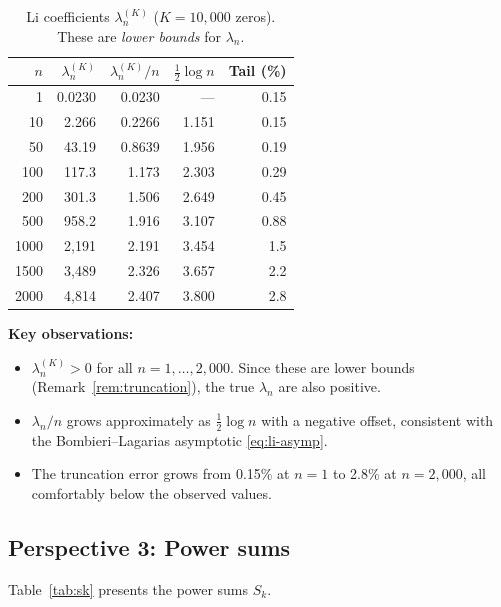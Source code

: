 \documentclass[11pt,a4paper]{article}
\theoremstyle{definition}
\begin{document}
\begin{table}[H]
\centering
\caption{Li coefficients $\lambda_n^{(K)}$ ($K = 10{,}000$ zeros). These are \emph{lower bounds} for $\lambda_n$.}
\label{tab:li}
\begin{tabular}{@{}rrrrr@{}}
\toprule
$n$ & $\lambda_n^{(K)}$ & $\lambda_n^{(K)}/n$ & $\tfrac{1}{2}\log n$ & Tail (\%) \\
\midrule
1     & 0.0230     & 0.0230    & ---     & 0.15 \\
10    & 2.266      & 0.2266    & 1.151   & 0.15 \\
50    & 43.19      & 0.8639    & 1.956   & 0.19 \\
100   & 117.3      & 1.173     & 2.303   & 0.29 \\
200   & 301.3      & 1.506     & 2.649   & 0.45 \\
500   & 958.2      & 1.916     & 3.107   & 0.88 \\
1000  & 2{,}191      & 2.191     & 3.454   & 1.5 \\
1500  & 3{,}489      & 2.326     & 3.657   & 2.2 \\
2000  & 4{,}814      & 2.407     & 3.800   & 2.8 \\
\bottomrule
\end{tabular}
\end{table}

\noindent\textbf{Key observations:}
\begin{itemize}
  \item $\lambda_n^{(K)} > 0$ for all $n = 1, \ldots, 2{,}000$. Since these are lower bounds (Remark~\ref{rem:truncation}), the true $\lambda_n$ are also positive.
  \item $\lambda_n/n$ grows approximately as $\tfrac{1}{2}\log n$ with a negative offset, consistent with the Bombieri--Lagarias asymptotic \eqref{eq:li-asymp}.
  \item The truncation error grows from 0.15\% at $n = 1$ to 2.8\% at $n = 2{,}000$, all comfortably below the observed values.
\end{itemize}

\subsection{Perspective 3: Power sums}

Table~\ref{tab:sk} presents the power sums $S_k$.
\end{document}
